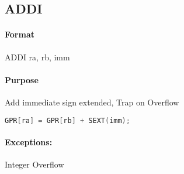 \subsection{ADDI}


\paragraph{Format} ADDI ra, rb, imm

\paragraph{Purpose} Add immediate sign extended, Trap on Overflow

\begin{lstlisting}[language=C]
    GPR[ra] = GPR[rb] + SEXT(imm);
\end{lstlisting}

\paragraph{Exceptions:} Integer Overflow
